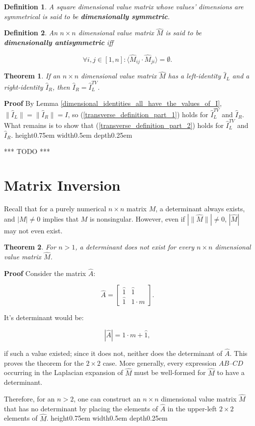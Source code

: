 \documentclass[10pt,letterpaper]{article}
\newtheorem{defn}{Definition}[section]
\newtheorem{thm}{Theorem}[section]
\newenvironment{proof}{\noindent\textbf{Proof} }{\qed \newline}
\newcommand{\qed}{\nobreak \ifvmode \relax \else
      \ifdim\lastskip<1.5em \hskip-\lastskip
      \hskip1.5em plus0em minus0.5em \fi \nobreak
      \vrule height0.75em width0.5em depth0.25em\fi}
\numberwithin{equation}{section}
\begin{document}
\begin{defn}A square dimensional value matrix whose values' dimensions
  are symmetrical is said to be \textbf{dimensionally
    symmetric}. \end{defn}

\begin{defn}An $n \times n$ dimensional value matrix $\hat M$ is said
  to be \textbf{dimensionally antisymmetric} iff

\[ \forall i,j \in [1, n] : \langle \hat M_{ij} \cdot \hat M_{ji} \rangle = \emptyset . \] \end{defn}

\begin{thm}If an $n \times n$ dimensional value matrix $\hat M$ has a
  left-identity $\hat I_L$ and a right-identity $\hat I_R$, then $\hat
  I_R = \hat I^{TV}_L$. \end{thm}

\begin{proof}By Lemma
  \ref{dimensional_identities_all_have_the_values_of_I}, $\| \hat I_L
  \| = \| \hat I_R \| = I$, so (\ref{transverse_definition_part_1})
  holds for $\hat I^{TV}_L$ and $\hat I_R$.  What remains is to show
  that (\ref{transverse_definition_part_2}) holds for $\hat I^{TV}_L$
  and $\hat I_R$. \end{proof}

*** TODO ***

\section{Matrix Inversion}

Recall that for a purely numerical $n \times n$ matrix $M$, a
determinant always exists, and $|M| \not= 0$ implies that $M$ is
nonsingular.  However, even if $| \| \hat M \| | \not= 0$, $| \hat M
|$ may not even exist.

\begin{thm}For $ n > 1$, a determinant does not exist for every $n
  \times n$ dimensional value matrix $\hat M$. \end{thm}

\begin{proof}Consider the matrix $\hat A$:

\[ \hat A = \left[ \begin{matrix}
 \hat 1 & \hat 1 \\
 \hat 1 & 1 \cdot m
 \end{matrix} \right] . \]

It's determinant would be:

\[ | \hat A | = 1 \cdot m + \hat 1 , \]

if such a value existed; since it does not, neither does the
determinant of $\hat A$.  This proves the theorem for the $2 \times 2$
case.  More generally, every expression $AB – CD$ occurring in the
Laplacian expansion of $\hat M$ must be well-formed for $\hat M$ to
have a determinant.

Therefore, for an $n > 2$, one can construct an $n \times n$
dimensional value matrix $\hat M$ that has no determinant by placing
the elements of $\hat A$ in the upper-left $2 \times 2$ elements of
$\hat M$. \end{proof}
\end{document}
